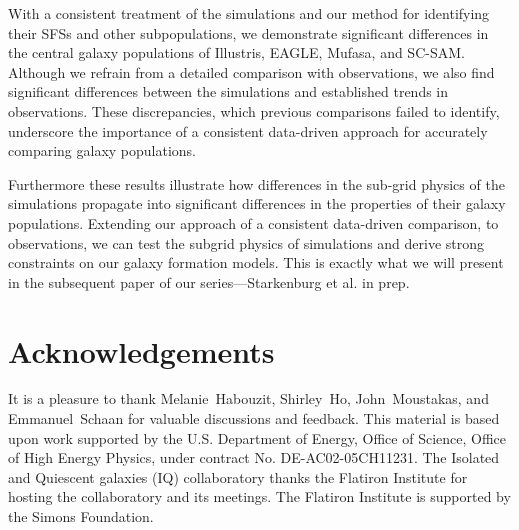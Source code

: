 \documentclass[tighten, preprint]{aastex62}
\begin{document}
{\color{red} With a consistent treatment of the simulations and our method
for identifying their SFSs and other subpopulations,
we demonstrate significant differences in the  
central galaxy populations of Illustris, EAGLE,  {\sc Mufasa}, and SC-SAM.} %
Although we refrain from a detailed 
comparison with observations, we also find significant differences 
between the simulations and established trends in observations. These
discrepancies, which previous comparisons failed to identify, underscore 
the importance of a consistent data-driven approach for accurately comparing 
galaxy populations.

{\color{red} Furthermore these results illustrate how differences in the 
sub-grid physics of the simulations propagate into significant differences  
in the properties of their galaxy populations. Extending our approach of 
a consistent data-driven comparison, to observations, we can test the 
subgrid physics of simulations and derive strong constraints on our galaxy 
formation models.} 
This is exactly what we will present in the subsequent paper of our 
series---Starkenburg et al. in prep.


\section*{Acknowledgements}
It is a pleasure to thank
	Melanie~Habouzit,
	Shirley~Ho, 
    John~Moustakas,
    and 
	Emmanuel~Schaan 
for valuable discussions and feedback. 
This material is based upon work supported by the U.S. Department
of Energy, Office of Science, Office of High Energy Physics, under
contract No. DE-AC02-05CH11231. The Isolated and Quiescent galaxies (IQ) 
collaboratory thanks the Flatiron Institute for hosting the collaboratory 
and its meetings. The Flatiron Institute is supported by the Simons Foundation.
\appendix
{}
\end{document}
